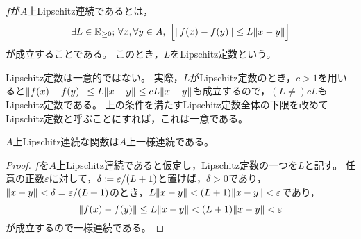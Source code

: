\documentclass[b5paper,draft]{ltjsbook}
\begin{document}
\begin{defi}[Lipschitz連続性]
    $f$が$A$上Lipschitz連続であるとは，
    \begin{equation}
        \exists L\in \Rnonnega;\, \forall x, \forall y \in A,\ \bsqu{
            \norm{\fun{f}{x}-\fun{f}{y}}\leq L \norm{x - y}
        }
    \end{equation}
    が成立することである。
    このとき，$L$をLipschitz定数という。
\end{defi}

\begin{rem}
    Lipschitz定数は一意的ではない。
    実際，$L$がLipschitz定数のとき，$c>1$を用いると$\norm{\fun{f}{x}-\fun{f}{y}}\leq L \norm{x - y}\leq cL \norm{x-y}$も成立するので，$(L\neq )cL$もLipschitz定数である。
    上の条件を満たすLipschitz定数全体の下限を改めてLipschitz定数と呼ぶことにすれば，これは一意である。
\end{rem}

\begin{prop}
    $A$上Lipschitz連続な関数は$A$上一様連続である。
    \begin{proof}
        $f$を$A$上Lipschitz連続であると仮定し，Lipschitz定数の一つを$L$と記す。
        任意の正数$\varepsilon$に対して，$\delta \coloneqq \varepsilon / \pare{L+1}$と置けば，$\delta >0$であり，$\norm{x-y}<\delta = {\varepsilon}/\pare{L+1}$のとき，$L\norm{x-y}<\pare{L+1}\norm{x-y}<\varepsilon$であり，
        \begin{equation}
            \norm{\fun{f}{x} - \fun{f}{y}} \leq L \norm{x - y}<\pare{L+1}\norm{x-y}<\varepsilon
        \end{equation}
        が成立するので一様連続である。
    \end{proof}
\end{prop}
\end{document}
